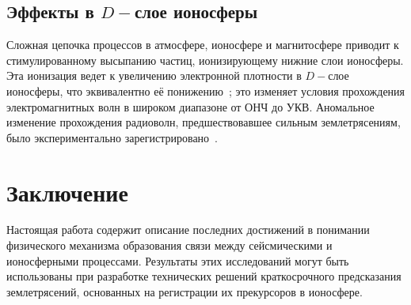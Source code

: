 \documentclass[12pt, oneside, a4paper]{article}
\begin{document}
\subsection{Эффекты в $D-$слое ионосферы}
Сложная цепочка процессов в атмосфере, ионосфере и магнитосфере приводит к стимулированному высыпанию частиц, ионизирующему нижние слои ионосферы. Эта ионизация ведет к увеличению электронной плотности в $D-$слое ионосферы, что эквивалентно её понижению~\cite{Kim:2002}; это изменяет условия прохождения электромагнитных волн в широком диапазоне от ОНЧ до УКВ. Аномальное изменение прохождения радиоволн, предшествовавшее сильным землетрясениям, было экспериментально зарегистрировано~\cite{Gufeld:1992}.  
\section{Заключение}
Настоящая работа содержит описание последних достижений в понимании физического механизма образования связи между сейсмическими и ионосферными процессами. Результаты этих исследований могут быть использованы при разработке технических решений краткосрочного предсказания землетрясений, основанных на регистрации их прекурсоров в ионосфере. 
\newpage


\end{document}
